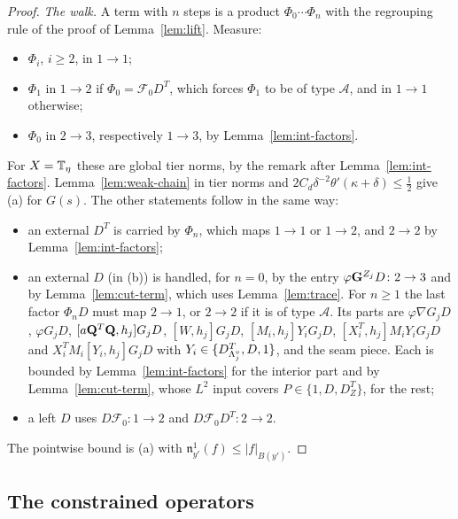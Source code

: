 \begin{proof}
\emph{The walk.} A term with $n$ steps is a product $\Phi_0\cdots\Phi_n$ with the regrouping rule of the proof of Lemma~\ref{lem:lift}. Measure:
\begin{itemize}
\item $\Phi_i$, $i\ge2$, in $1\to1$;
\item $\Phi_1$ in $1\to2$ if $\Phi_0=\mathcal F_0D^T$, which forces $\Phi_1$ to be of type $\mathcal A$, and in $1\to1$ otherwise;
\item $\Phi_0$ in $2\to3$, respectively $1\to3$, by Lemma~\ref{lem:int-factors}.
\end{itemize}
For $X=\mathbb T_\eta$ these are global tier norms, by the remark after Lemma~\ref{lem:int-factors}. Lemma~\ref{lem:weak-chain} in tier norms and $2C_d\delta^{-2}\theta'(\kappa+\delta)\le\frac12$ give (a) for $G(s)$. The other statements follow in the same way:
\begin{itemize}
\item an external $D^T$ is carried by $\Phi_n$, which maps $1\to1$ or $1\to2$, and $2\to2$ by Lemma~\ref{lem:int-factors};
\item an external $D$ (in (b)) is handled, for $n=0$, by the entry $\varphi\mathbf G^{Z_j}D\colon2\to3$ and by Lemma~\ref{lem:cut-term}, which uses Lemma~\ref{lem:trace}. For $n\ge1$ the last factor $\Phi_nD$ must map $2\to1$, or $2\to2$ if it is of type $\mathcal A$. Its parts are $\varphi\nabla G_jD$, $\varphi G_jD$, $[a\mathbf Q^T\mathbf Q,h_j]G_jD$, $[W,h_j]G_jD$, $[M_i,h_j]Y_iG_jD$, $[X_i^T,h_j]M_iY_iG_jD$ and $X_i^TM_i[Y_i,h_j]G_jD$ with $Y_i\in\{D^T_{\Lambda^v_j},D,1\}$, and the seam piece. Each is bounded by Lemma~\ref{lem:int-factors} for the interior part and by Lemma~\ref{lem:cut-term}, whose $L^2$ input covers $P\in\{1,D,D^T_Z\}$, for the rest;
\item a left $D$ uses $D\mathcal F_0\colon1\to2$ and $D\mathcal F_0D^T\colon2\to2$.
\end{itemize}
The pointwise bound is (a) with $\mathfrak n^1_{y'}(f)\le|f|_{B(y')}$.
\end{proof}

\subsection{The constrained operators}

